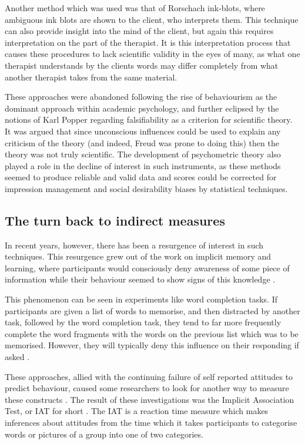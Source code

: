 Another method which was used was that of Rorschach ink-blots, where ambiguous ink blots are shown to the client, who interprets them. This technique can also provide insight into the mind of the client, but again this requires interpretation on the part of the therapist. It is this interpretation process that causes these procedures to lack scientific validity in the eyes of many, as what one therapist understands by the clients words may differ completely from what another therapist takes from the same material. 

These approaches were abandoned following the rise of behaviourism as the dominant approach within academic psychology, and further eclipsed by the notions of Karl Popper regarding falsifiability as a criterion for scientific theory. It was argued that since unconscious influences could be used to explain any criticism of the theory (and indeed, Freud was prone to doing this) then the theory was not truly scientific. The development of psychometric theory also played a role in the decline of interest in such instruments, as these methods seemed to produce reliable and valid data and scores could be corrected for impression management and social desirability biases by statistical techniques. 

\subsection{The turn back to indirect measures}
\label{sec:turn-back-indirect}
In recent years, however, there has been a resurgence of interest in such techniques. This resurgence grew out of the work on implicit memory and learning, where participants would consciously deny awareness of some piece of information while their behaviour seemed to show signs of this knowledge .  

This phenomenon can be seen in  experiments like word completion tasks. If participants are given a list of words to memorise, and then distracted by another task, followed by the word completion task, they tend to far more frequently complete the word fragments with the words on the previous list which was to be memorised.  However, they will typically deny this influence on their responding if asked \cite{Wittenbrink2007a}. 

These approaches, allied with the continuing failure of self reported attitudes to predict behaviour, caused some researchers to look for another way to measure these constructs \cite{Greenwald1995a}. The result of these investigations was the Implicit Association Test, or IAT for short \cite{Greenwald1998}. The IAT is a reaction time measure which makes inferences about attitudes from the time which it takes participants to categorise words or pictures of a group into one of two categories. 

